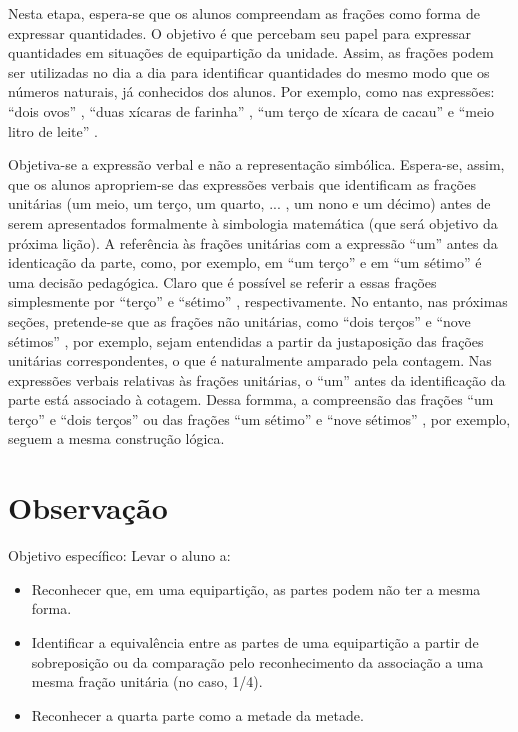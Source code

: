\documentclass{book}
\begin{document}
  Nesta etapa, espera-se que os alunos compreendam as frações como forma de expressar quantidades. O objetivo é que percebam seu papel para expressar quantidades em situações de equipartição da unidade. Assim, as frações podem ser utilizadas no dia a dia para identificar quantidades do mesmo modo que os números naturais, já conhecidos dos alunos. Por exemplo, como nas expressões:   ``dois ovos''  ,   ``duas xícaras de farinha''  ,   ``um terço de xícara de cacau''   e   ``meio litro de leite''  .

  Objetiva-se a expressão verbal e não a representação simbólica. Espera-se, assim, que os alunos apropriem-se das expressões verbais que identificam as frações unitárias (um meio, um terço, um quarto, ... , um nono e um décimo) antes de serem apresentados formalmente à simbologia matemática (que será objetivo da próxima lição).  A referência às frações unitárias com a expressão   ``um''   antes da identicação da parte, como, por exemplo, em   ``um terço''   e em   ``um sétimo''   é uma decisão pedagógica. Claro que é possível se referir a essas frações simplesmente por   ``terço''   e   ``sétimo''  , respectivamente. No entanto, nas próximas seções, pretende-se que as frações não unitárias, como   ``dois terços''   e   ``nove sétimos''  , por exemplo, sejam entendidas a partir da justaposição das frações unitárias correspondentes, o que é naturalmente amparado pela contagem. Nas expressões verbais relativas às frações unitárias, o   ``um''   antes da identificação da parte está associado à cotagem. Dessa formma, a compreensão das frações   ``um terço''   e   ``dois terços''   ou das frações   ``um sétimo''   e   ``nove sétimos''  , por exemplo, seguem a mesma construção lógica.


\newpage


\section{Observação}
  Objetivo específico: Levar o aluno a:
\begin{itemize} %
    \item       Reconhecer que, em uma equipartição, as partes podem não ter a mesma forma.
    \item       Identificar a equivalência entre as partes de uma equipartição a partir de sobreposição ou da comparação pelo reconhecimento da associação a uma mesma fração unitária (no caso, 1/4).
    \item       Reconhecer a quarta parte como a metade da metade.
\end{itemize} %
\end{document}
